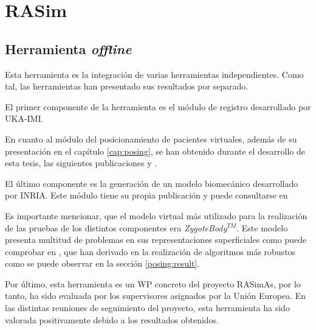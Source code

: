 \section{RASim}


\subsection{Herramienta \emph{offline}}
\label{result:herramienta}
Esta herramienta es la integración de varias herramientas independientes.  Como tal, las herramientas han presentado sus resultados por separado.

El primer componente de la herramienta es el módulo de registro desarrollado por \ac{UKA-IMI}. 

En cuanto al módulo del posicionamiento de pacientes virtuales, además de su presentación en el capítulo \ref{cap:posing}, se han obtenido durante el desarrollo de esta tesis, las siguientes publicaciones \cite{asdfga} y \cite{asdfas}.

El último componente es la generación de un modelo biomecánico desarrollado por \ac{INRIA}. Este módulo tiene su propia publicación y puede consultarse en \cite{asdf}

Es importante mencionar, que el modelo virtual más utilizado para la realización de las pruebas de los distintos componentes era \emph{ZygoteBody}$^{TM}$. Este modelo presenta multitud de problemas en sus representaciones superficiales como puede comprobar en \cite{zaitseva}, que han derivado en la realización de algoritmos más robustos como se puede observar en la sección \ref{posing:result}.

Por último, esta herramienta es un \ac{WP} concreto del proyecto \ac{RASimAs}, por lo tanto, ha sido evaluada por los supervisores asignados por la Unión Europea. En las distintas reuniones de seguimiento del proyecto, esta herramienta ha sido valorada positivamente debido a los resultados obtenidos.




